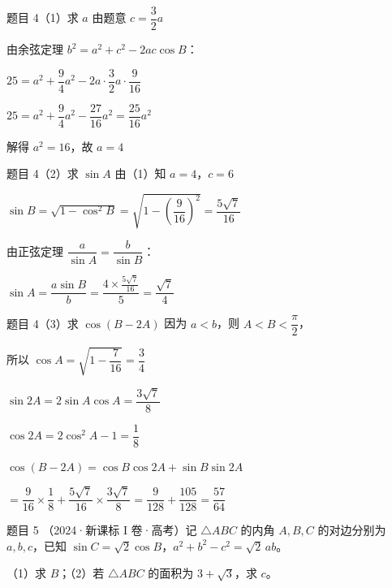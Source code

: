 \documentclass[UTF8]{ctexbeamer}
\begin{document}
	\begin{frame}{题目 4（1）\quad 求 $a$}
		由题意 $c = \dfrac{3}{2}a$
		\pause
		
		由余弦定理 $b^2 = a^2 + c^2 - 2ac\cos B$：
		\pause
		
		$25 = a^2 + \dfrac{9}{4}a^2 - 2a \cdot \dfrac{3}{2}a \cdot \dfrac{9}{16}$
		\pause
		
		$25 = a^2 + \dfrac{9}{4}a^2 - \dfrac{27}{16}a^2 = \dfrac{25}{16}a^2$
		\pause
		
		解得 $a^2 = 16$，故 $a = 4$
	\end{frame}
	
	\begin{frame}{题目 4（2）\quad 求 $\sin A$}
		由（1）知 $a = 4$，$c = 6$
		\pause
		
		$\sin B = \sqrt{1 - \cos^2 B} = \sqrt{1 - \left(\dfrac{9}{16}\right)^2} = \dfrac{5\sqrt{7}}{16}$
		\pause
		
		由正弦定理 $\dfrac{a}{\sin A} = \dfrac{b}{\sin B}$：
		\pause
		
		$\sin A = \dfrac{a \sin B}{b} = \dfrac{4 \times \frac{5\sqrt{7}}{16}}{5} = \dfrac{\sqrt{7}}{4}$
	\end{frame}
	
	\begin{frame}{题目 4（3）\quad 求 $\cos(B-2A)$}
		因为 $a < b$，则 $A < B < \dfrac{\pi}{2}$，
		
		所以 $\cos A = \sqrt{1 - \dfrac{7}{16}} = \dfrac{3}{4}$
		\pause
		
		$\sin 2A = 2\sin A\cos A = \dfrac{3\sqrt{7}}{8}$
		\pause
		
		$\cos 2A = 2\cos^2 A - 1 = \dfrac{1}{8}$
		\pause
		
		\vspace{0.2cm}
		$\cos(B - 2A) = \cos B\cos 2A + \sin B\sin 2A$
		\pause
		
		$= \dfrac{9}{16} \times \dfrac{1}{8} + \dfrac{5\sqrt{7}}{16} \times \dfrac{3\sqrt{7}}{8} = \dfrac{9}{128} + \dfrac{105}{128} = \dfrac{57}{64}$
	\end{frame}
	
	\begin{frame}{题目 5}
		（2024·新课标 I 卷·高考）记 $\triangle ABC$ 的内角 $A, B, C$ 的对边分别为 $a, b, c$，已知 $\sin C = \sqrt{2}\cos B$，$a^2 + b^2 - c^2 = \sqrt{2}\,ab$。
		
		\vspace{0.3cm}
		（1）求 $B$；\quad （2）若 $\triangle ABC$ 的面积为 $3 + \sqrt{3}$，求 $c$。
	\end{frame}
	
\end{document}
